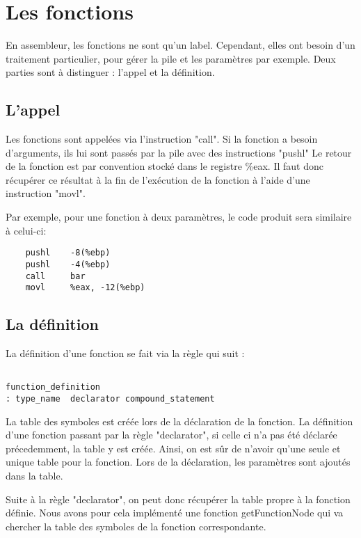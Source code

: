 \section{Les fonctions}

En assembleur, les fonctions ne sont qu'un label. Cependant, elles ont besoin d'un traitement particulier, pour gérer la pile et les paramètres par exemple.
Deux parties sont à distinguer : l'appel et la définition.

\subsection*{L'appel}

Les fonctions sont appelées via l'instruction "call".
Si la fonction a besoin d'arguments, ils lui sont passés par la pile avec des instructions "pushl"
Le retour de la fonction est par convention stocké dans le registre \%eax. Il faut donc récupérer ce résultat à la fin de l'exécution de la fonction à l'aide d'une instruction "movl".

Par exemple, pour une fonction à deux paramètres, le code produit sera similaire à celui-ci:

\begin{verbatim}
	pushl	 -8(%ebp)
	pushl	 -4(%ebp)
	call	 bar
	movl	 %eax, -12(%ebp) 
\end{verbatim}

\subsection*{La définition}

La définition d'une fonction se fait via la règle qui suit :

\begin{verbatim}
 
function_definition
: type_name  declarator compound_statement 

\end{verbatim}

La table des symboles est créée lors de la déclaration de la fonction. La définition d'une fonction passant par la règle "declarator", si celle ci n'a pas été déclarée précedemment, la table y est créée. Ainsi, on est sûr de n'avoir qu'une seule et unique table pour la fonction. Lors de la déclaration, les paramètres sont ajoutés dans la table.

Suite à la règle "declarator", on peut donc récupérer la table propre à la fonction définie. Nous avons pour cela implémenté une fonction getFunctionNode qui va chercher la table des symboles de la fonction correspondante.

